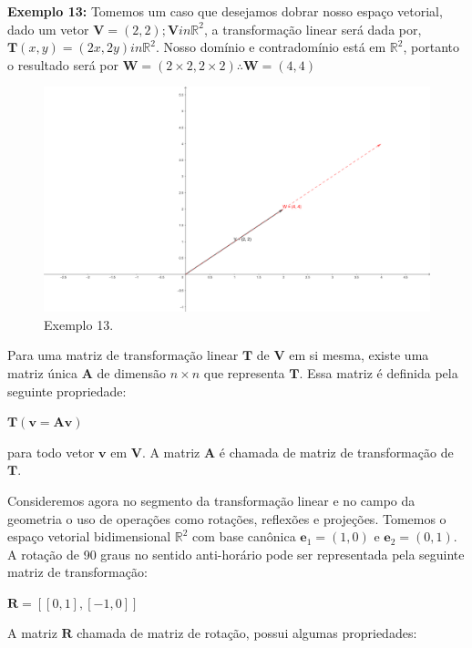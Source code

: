 \noindent\textbf{Exemplo 13:} Tomemos um caso que desejamos dobrar nosso espaço vetorial, dado um vetor $\mathbf{V} = (2, 2); \mathbf{V} in \mathbb{R}^2$, a transformação linear será dada por, $\mathbf{T}(x, y) = (2x, 2y) in \mathbb{R}^2$. Nosso domínio e contradomínio está em $\mathbb{R}^2$, portanto o resultado será por $\mathbf{W} = (2 \times 2, 2 \times 2) \therefore \mathbf{W} = (4, 4)$

\begin{figure}[H]
	\centering
	\includegraphics[scale=1.30]{t_exemplo13.png}
	\caption{Exemplo 13.}
\end{figure}

Para uma matriz de transformação linear $\mathbf{T}$ de $\mathbf{V}$ em si mesma, existe uma matriz única $\mathbf{A}$ de dimensão $ n \times n$ que representa $\mathbf{T}$. Essa matriz é definida pela seguinte propriedade:

\centerline{$\mathbf{T}(\mathbf{v} = \mathbf{A}\mathbf{v})$}

\noindent para todo vetor $\mathbf{v}$ em $\mathbf{V}$. A matriz $\mathbf{A}$ é chamada de matriz de transformação de $\mathbf{T}$.

Consideremos agora no segmento da transformação linear e no campo da geometria o uso de operações como rotações, reflexões e projeções. Tomemos o espaço vetorial bidimensional $\mathbb{R}^2$ com base canônica $\mathbf{e}_1 = (1, 0)$ e $\mathbf{e}_2 = (0, 1)$. A rotação de 90 graus no sentido anti-horário pode ser representada pela seguinte matriz de transformação:

\centerline{$\mathbf{R} = [[0, 1], [-1, 0]]$}

A matriz $\mathbf{R}$ chamada de matriz de rotação, possui algumas propriedades:

